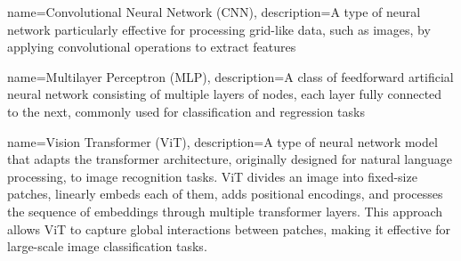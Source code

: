 
{
    name={Convolutional Neural Network (CNN)},
    description={A type of neural network particularly effective for processing grid-like data, such as images, by applying convolutional operations to extract features}
}

{
    name={Multilayer Perceptron (MLP)},
    description={A class of feedforward artificial neural network consisting of multiple layers of nodes, each layer fully connected to the next, commonly used for classification and regression tasks}
}


{
name={Vision Transformer (ViT)},
description={A type of neural network model that adapts the transformer architecture, originally designed for natural language processing, to image recognition tasks. ViT divides an image into fixed-size patches, linearly embeds each of them, adds positional encodings, and processes the sequence of embeddings through multiple transformer layers. This approach allows ViT to capture global interactions between patches, making it effective for large-scale image classification tasks.}
}
